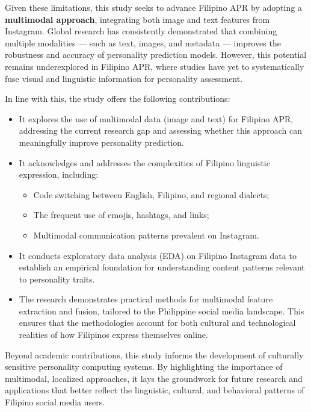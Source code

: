 Given these limitations, this study seeks to advance Filipino APR by adopting a \textbf{multimodal approach}, integrating both image and text features from Instagram. Global research has consistently demonstrated that combining multiple modalities --- such as text, images, and metadata --- improves the robustness and accuracy of personality prediction models. However, this potential remains underexplored in Filipino APR, where studies have yet to systematically fuse visual and linguistic information for personality assessment.

In line with this, the study offers the following contributions:

\begin{itemize}
	\item It explores the use of multimodal data (image and text) for Filipino APR, addressing the current research gap and assessing whether this approach can meaningfully improve personality prediction.
	
	\item It acknowledges and addresses the complexities of Filipino linguistic expression, including:
	\begin{itemize}
		\item Code switching between English, Filipino, and regional dialects;
		\item The frequent use of emojis, hashtags, and links;
		\item Multimodal communication patterns prevalent on Instagram.
	\end{itemize}
	
	\item It conducts exploratory data analysis (EDA) on Filipino Instagram data to establish an empirical foundation for understanding content patterns relevant to personality traits.
	
	\item The research demonstrates practical methods for multimodal feature extraction and fusion, tailored to the Philippine social media landscape. This ensures that the methodologies account for both cultural and technological realities of how Filipinos express themselves online.
\end{itemize}

Beyond academic contributions, this study informs the development of culturally sensitive personality computing systems. By highlighting the importance of multimodal, localized approaches, it lays the groundwork for future research and applications that better reflect the linguistic, cultural, and behavioral patterns of Filipino social media users.

